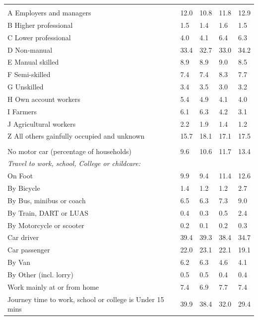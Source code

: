 \documentclass{article}
\begin{document}
\begin{table}[h]
\begin{tabular}{KTTTT}
\hline
    \\ 
    \hline
A Employers and managers & 12.0& 10.8& 11.8& 12.9\\
B Higher professional & 1.5& 1.4& 1.6& 1.5\\
C Lower professional & 4.0& 4.1& 6.4& 6.3\\
D Non-manual & 33.4& 32.7& 33.0& 34.2\\
E Manual skilled & 8.9& 8.9& 9.0& 8.5\\
F Semi-skilled & 7.4& 7.4& 8.3& 7.7\\
G Unskilled & 3.4& 3.5& 3.0& 3.2\\
H Own account workers & 5.4& 4.9& 4.1& 4.0\\
I Farmers & 6.1& 6.3& 4.2& 3.1\\
J Agricultural workers & 2.2& 1.9& 1.4& 1.2\\
Z All others gainfully occupied and unknown & 15.7& 18.1& 17.1& 17.5\\
\hline
{}\hline
    \\ 
    \hline
No motor car (percentage of households) &  9.6& 10.6& 11.7& 
13.4\\
    \hline 
\emph{Travel to work, school, College or childcare:} & & & \\
\quad On Foot &  9.9&  9.4& 11.4& 12.6\\ 
\quad By Bicycle & 1.4& 1.2& 1.2& 2.7\\ 
\quad By Bus, minibus or coach & 6.5& 6.3& 7.3& 9.0\\
\quad By Train, DART or LUAS & 0.4& 0.3& 0.5& 2.4\\
\quad By Motorcycle or scooter & 0.2& 0.1& 0.2& 0.3\\
\quad Car driver & 39.4 & 39.3& 38.4& 34.7\\
\quad Car passenger & 22.0& 23.1& 22.1& 19.1\\
\quad By Van & 6.2& 6.3& 4.6& 4.1\\
\quad By Other (incl. lorry) & 0.5& 0.5& 0.4& 0.4\\
    \hline
Work mainly at or from home & 7.4& 6.9& 7.7& 7.4\\
Journey time to work, school or college is Under 15 mins & 39.9& 38.4& 32.0& 29.4\\

\end{tabular}
\end{table}
\end{document}
